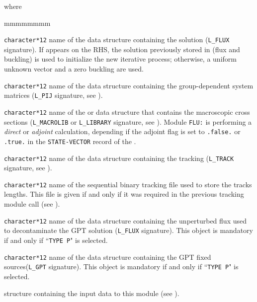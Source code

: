 \noindent where
\begin{ListeDeDescription}{mmmmmmmm}

\item[\dusa{FLUNAM}] {\tt character*12} name of the  data structure
containing the solution ({\tt L\_FLUX} signature). If  appears on
the RHS, the solution previously stored in  (flux and buckling) is used to initialize
the new iterative process; otherwise, a uniform unknown vector and a zero buckling
are used.

\item[\dusa{PIJNAM}] {\tt character*12} name of the  data
structure containing the group-dependent system
matrices ({\tt L\_PIJ} signature, see ).

\item[\dusa{LIBNAM}] {\tt character*12} name of the  or  data structure that contains the
macroscopic cross sections ({\tt L\_MACROLIB} or {\tt L\_LIBRARY} signature, see ).
Module {\tt FLU:} is performing a {\sl direct} or {\sl adjoint} calculation, depending if the adjoint flag
is set to {\tt .false.} or {\tt .true.} in the {\tt STATE-VECTOR} record of the .

\item[\dusa{TRKNAM}] {\tt character*12} name of the  data
structure containing the tracking ({\tt L\_TRACK} signature, see ).

\item[\dusa{TRKFIL}] {\tt character*12} name of the sequential binary tracking
file used to store the tracks lengths. This file is given if and only if it was
required in the previous tracking module call (see ).

\item[\dusa{TRKFLP}] {\tt character*12} name of the  data structure containing the
unperturbed flux used to decontaminate the GPT solution ({\tt L\_FLUX} signature). This object is
mandatory if and only if ``{\tt TYPE P}" is selected.

\item[\dusa{TRKGPT}] {\tt character*12} name of the  data structure
containing the GPT fixed sources({\tt L\_GPT} signature). This object is
mandatory if and only if ``{\tt TYPE P}" is selected.

\item[\dstr{descflu}] structure containing the input data to this module (see
).

\end{ListeDeDescription}

